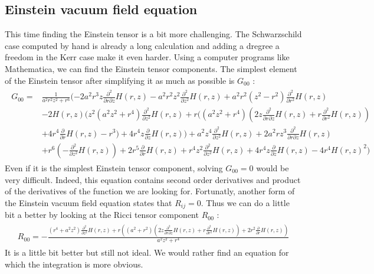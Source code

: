 \documentclass[a4paper,12pt]{article}
\theoremstyle{definition}
\begin{document}
\subsection{Einstein vacuum field equation}
This time finding the Einstein tensor is a bit more challenging.
The Schwarzschild case computed by hand is already a long calculation and adding a dregree a freedom in the Kerr case make it even harder.
Using a computer programs like Mathematica, we can find the Einstein tensor components.
The simplest element of the Einstein tensor after simplifying it as much as possible is $G_{00}$ :
\begin{align}
\begin{split}
	G_{00} = &\frac{1}{a^2 r^2z^2+r^6}(-2 a^2 r^3 z \frac{\partial^2}{\partial r\partial z}H(r,z)-a^2 r^2 z^2 \frac{\partial^2}{\partial z^2}H(r,z)+a^2 r^2(z^2-r^2) \frac{\partial^2}{\partial r^2}H(r,z)\\
	&-2 H(r,z) (z^2 (a^2z^2+r^4) \frac{\partial^2}{\partial z^2}H(r,z)+r ((a^2 z^2+r^4)(2 z \frac{\partial^2}{\partial r\partial z}H(r,z)+r \frac{\partial^2}{\partial r^2}H(r,z))\\
	&+4r^4\frac{\partial}{\partial r}H(r,z)-r^3)+4 r^4 z \frac{\partial}{\partial z}H(r,z))+a^2 z^4\frac{\partial^2}{\partial z^2}H(r,z)+2 a^2 r z^3 \frac{\partial^2}{\partial r\partial z}H(r,z)\\
	&+r^6(-\frac{\partial^2}{\partial z^2}H(r,z))+2 r^5 \frac{\partial}{\partial r}H(r,z)+r^4 z^2\frac{\partial^2}{\partial z^2}H(r,z)+4 r^4 z \frac{\partial}{\partial z}H(r,z)-4 r^4 H(r,z)^2)
\end{split}
\end{align}
Even if it is the simplest Einstein tensor component, solving $G_{00}=0$ would be very difficult.
Indeed, this equation contains second order derivatives and product of the derivatives of the function we are looking for.
Fortunatly, another form of the Einstein vacuum field equation states that $R_{ij}=0$.
Thus we can do a little bit a better by looking at the Ricci tensor component $R_{00}$ :
\begin{align}
\begin{split}
	R_{00}=-\frac{(r^4+a^2z^2)\frac{\partial^2}{\partial z^2}H(r,z)+r
	((a^2+r^2) (2 z \frac{\partial^2}{\partial r\partial z}H(r,z)+r
	\frac{\partial^2}{\partial r^2}H(r,z))+2 r^2 \frac{\partial}{\partial r}H(r,z))}{a^2 z^2+r^4}
\end{split}
\end{align}
It is a little bit better but still not ideal.
We would rather find an equation for which the integration is more obvious.
\end{document}
